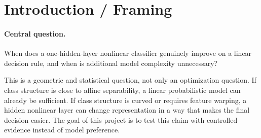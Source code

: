 \documentclass[sigconf,screen,nonacm]{acmart}
\title{\ProjectTitle}
\subtitle{\ProjectType}
\author{Sabuhi Nazarov}
\affiliation{%
  \institution{\CourseName}
    \city{Baku}
  \country{Azerbaijan}
}
\author{Agshin Fataliyev}
\affiliation{%
  \institution{\CourseName}
    \city{Baku}
  \country{Azerbaijan}
}
\begin{document}
\begin{abstract}
We study when a one-hidden-layer nonlinear classifier improves over a linear decision rule and when extra complexity is unnecessary. We implement softmax regression and a one-hidden-layer $\tanh$ network from scratch in NumPy, then compare them on two synthetic tasks with different geometry: linear Gaussian and moons. The experiments use the same splits, train-fit standardization, and metrics across models. On linear Gaussian, both models reach the same test accuracy (95.00\%), which supports the claim that linear geometry is sufficient there. On moons, the hidden-layer model improves from 85.00\% to 96.25\% test accuracy and substantially lowers cross-entropy, which shows a meaningful representational gain from nonlinearity. The report also documents implementation sanity checks and discusses what these results do and do not justify.
\end{abstract}


\maketitle

\section{Introduction / Framing}

\paragraph{Central question.}
When does a one-hidden-layer nonlinear classifier genuinely improve on a linear decision rule, and when is additional model complexity unnecessary?

This is a geometric and statistical question, not only an optimization question. If class structure is close to affine separability, a linear probabilistic model can already be sufficient. If class structure is curved or requires feature warping, a hidden nonlinear layer can change representation in a way that makes the final decision easier. The goal of this project is to test this claim with controlled evidence instead of model preference.
\end{document}
